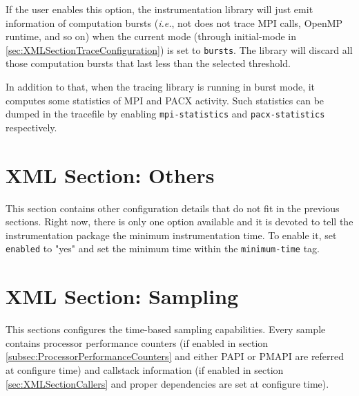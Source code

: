 If the user enables this option, the instrumentation library will just emit information of computation bursts ({\em i.e.}, not does not trace {MPI} calls, {OpenMP} runtime, and so on) when the current mode (through initial-mode in \ref{sec:XMLSectionTraceConfiguration}) is set to {\tt bursts}. The library will discard all those computation bursts that last less than the selected threshold.

In addition to that, when the tracing library is running in burst mode, it computes some statistics of MPI and PACX activity. Such statistics can be dumped in the tracefile by enabling {\tt mpi-statistics} and {\tt pacx-statistics} respectively.


\section{XML Section: Others}\label{sec:XMLSectionOthers}



This section contains other configuration details that do not fit in the previous sections. Right now, there is only one option available and it is devoted to tell the instrumentation package the minimum instrumentation time. To enable it, set {\tt enabled} to "yes" and set the minimum time within the {\tt minimum-time} tag.

\section{XML Section: Sampling}\label{sec:XMLSectionSampling}



This sections configures the time-based sampling capabilities. Every sample contains processor performance counters (if enabled in section \ref{subsec:ProcessorPerformanceCounters} and either PAPI or PMAPI are referred at configure time) and callstack information (if enabled in section \ref{sec:XMLSectionCallers} and proper dependencies are set at configure time).

